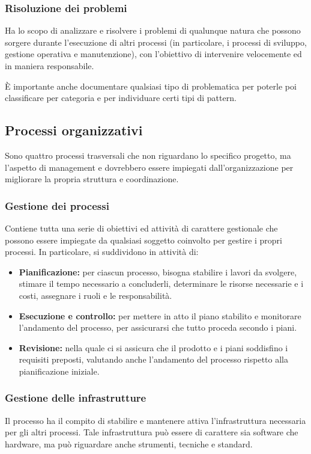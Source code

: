 \subsubsection{Risoluzione dei problemi}
Ha lo scopo di analizzare e risolvere i problemi di qualunque natura che possono sorgere durante l'esecuzione di altri processi (in particolare, i processi di sviluppo, gestione operativa e manutenzione), con l'obiettivo di intervenire velocemente ed in maniera responsabile.
\par È importante anche documentare qualsiasi tipo di problematica per poterle poi classificare per categoria e per individuare certi tipi di pattern.

\subsection{Processi organizzativi}
Sono quattro processi trasversali che non riguardano lo specifico progetto, ma l'aspetto di management e dovrebbero essere impiegati dall'organizzazione per migliorare la propria struttura e coordinazione.
\subsubsection{Gestione dei processi}
Contiene tutta una serie di obiettivi ed attività di carattere gestionale che possono essere impiegate da qualsiasi soggetto coinvolto per gestire i propri processi. In particolare, si suddividono in attività di:
\begin{itemize}
    \item \textbf{Pianificazione: }per ciascun processo, bisogna stabilire i lavori da svolgere, stimare il tempo necessario a concluderli, determinare le risorse necessarie e i costi, assegnare i ruoli e le responsabilità.
    \item \textbf{Esecuzione e controllo:} per mettere in atto il piano stabilito e monitorare l'andamento del processo, per assicurarsi che tutto proceda secondo i piani.
    \item \textbf{Revisione:} nella quale ci si assicura che il prodotto e i piani soddisfino i requisiti preposti, valutando anche l'andamento del processo rispetto alla pianificazione iniziale.
\end{itemize}
\subsubsection{Gestione delle infrastrutture}
Il processo ha il compito di stabilire e mantenere attiva l'infrastruttura necessaria per gli altri processi. Tale infrastruttura può essere di carattere sia software che hardware, ma può riguardare anche strumenti, tecniche e standard.
